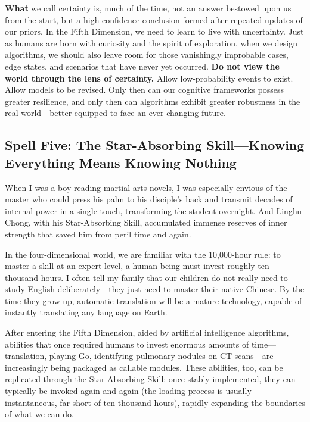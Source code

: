 \textbf{What} we call certainty is, much of the time, not an answer bestowed upon us from the start, but a high-confidence conclusion formed after repeated updates of our priors. In the Fifth Dimension, we need to learn to live with uncertainty. Just as humans are born with curiosity and the spirit of exploration, when we design algorithms, we should also leave room for those vanishingly improbable cases, edge states, and scenarios that have never yet occurred. \textbf{Do not view the world through the lens of certainty.} Allow low-probability events to exist. Allow models to be revised. Only then can our cognitive frameworks possess greater resilience, and only then can algorithms exhibit greater robustness in the real world---better equipped to face an ever-changing future.

\subsection{Spell Five: The Star-Absorbing Skill---Knowing Everything Means Knowing Nothing}
When I was a boy reading martial arts novels, I was especially envious of the master who could press his palm to his disciple's back and transmit decades of internal power in a single touch, transforming the student overnight. And Linghu Chong, with his Star-Absorbing Skill, accumulated immense reserves of inner strength that saved him from peril time and again.

\vspace{1em}

In the four-dimensional world, we are familiar with the 10,000-hour rule: to master a skill at an expert level, a human being must invest roughly ten thousand hours. I often tell my family that our children do not really need to study English deliberately---they just need to master their native Chinese. By the time they grow up, automatic translation will be a mature technology, capable of instantly translating any language on Earth.

After entering the Fifth Dimension, aided by artificial intelligence algorithms, abilities that once required humans to invest enormous amounts of time---translation, playing Go, identifying pulmonary nodules on CT scans---are increasingly being packaged as callable modules. These abilities, too, can be replicated through the Star-Absorbing Skill: once stably implemented, they can typically be invoked again and again (the loading process is usually instantaneous, far short of ten thousand hours), rapidly expanding the boundaries of what we can do.

